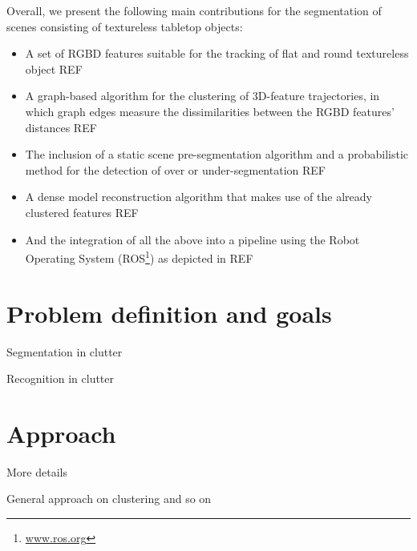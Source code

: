 Overall, we present the following main contributions for the
segmentation of scenes consisting of textureless tabletop
objects:
\begin{itemize}
\item A set of RGBD features suitable for the tracking of
  flat and round textureless object REF%
\item A graph-based algorithm  for the clustering of 3D-feature
trajectories, in which graph edges measure the dissimilarities between the RGBD
features' distances REF%
\item The inclusion of a static scene pre-segmentation algorithm
  and a probabilistic method for the detection of over or under-segmentation REF%
\item A dense model reconstruction algorithm that makes use of the already clustered features REF%
\item And the integration of all the above into a pipeline using the
  Robot Operating System (ROS\footnote{\url{www.ros.org}}) as depicted in REF%
\end{itemize}



\section{Problem definition and goals}
\item Segmentation in clutter
\item Recognition in clutter

\section{Approach}
\item More details
\item General approach on clustering and so on	 


